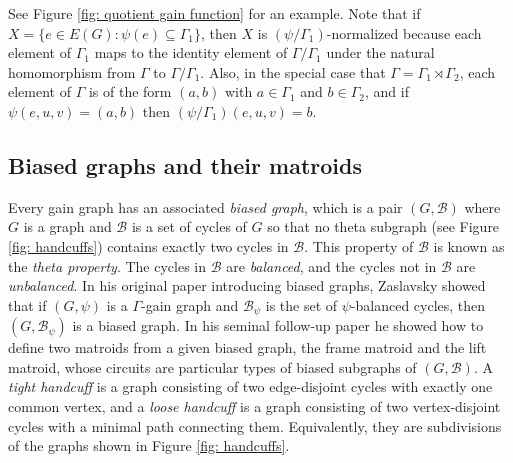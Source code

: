 \documentclass[12pt]{article}
\theoremstyle{definition}
\newcommand{\cB}{\mathcal{B}}
\begin{document}
See Figure \ref{fig: quotient gain function} for an example.
Note that if $X = \{e \in E(G) \colon \psi(e) \subseteq \Gamma_1\}$, then $X$ is $(\psi/\Gamma_1)$-normalized because each element of $\Gamma_1$ maps to the identity element of $\Gamma/\Gamma_1$ under the natural homomorphism from $\Gamma$ to $\Gamma/\Gamma_1$.
Also, in the special case that $\Gamma = \Gamma_1 \rtimes \Gamma_2$, each element of $\Gamma$ is of the form $(a, b)$ with $a \in \Gamma_1$ and $b \in \Gamma_2$, and if $\psi(e, u, v) = (a, b)$ then $(\psi/\Gamma_1)(e, u, v) = b$.







\subsection{Biased graphs and their matroids}



Every gain graph has an associated \emph{biased graph}, which is a pair $(G, \cB)$ where $G$ is a graph and $\cB$ is a set of cycles of $G$ so that no theta subgraph (see Figure \ref{fig: handcuffs}) contains exactly two cycles in $\cB$.
This property of $\cB$ is known as the \emph{theta property}.
The cycles in $\cB$ are \emph{balanced}, and the cycles not in $\cB$ are \emph{unbalanced}.
In his original paper introducing biased graphs, Zaslavsky \cite{Zaslavsky1989} showed that if $(G, \psi)$ is a $\Gamma$-gain graph and $\cB_{\psi}$ is the set of $\psi$-balanced cycles, then $(G, \cB_{\psi})$ is a biased graph.
In his seminal follow-up paper \cite{Zaslavsky1991} he showed how to define two matroids from a given biased graph, the frame matroid and the lift matroid, whose circuits are particular types of biased subgraphs of $(G, \cB)$.
A \emph{tight handcuff} is a graph consisting of two edge-disjoint cycles with exactly one common vertex, and a \emph{loose handcuff} is a graph consisting of two vertex-disjoint cycles with a minimal path connecting them.
Equivalently, they are subdivisions of the graphs shown in Figure \ref{fig: handcuffs}.
\end{document}
